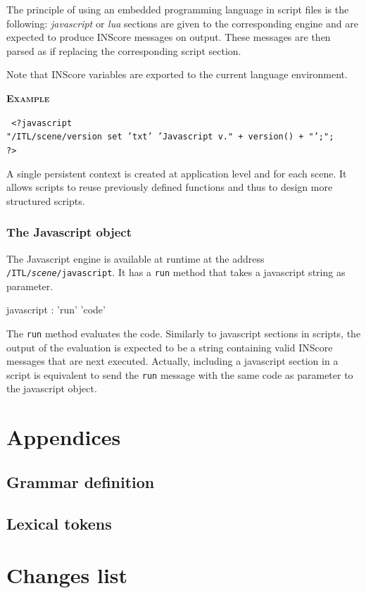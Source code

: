 \documentclass[a4paper,twoside]{report}
\newcommand{\toplevel}[1]	{\chapter{#1}}
\newcommand{\sublevel}[1]	{\section{#1}}
\newcommand{\subsublevel}[1]	{\subsection{#1}}
\newcommand{\OSC}[1]		{\texttt{#1}}
\newcommand{\example}		{\textbf{\hspace{-1.5cm}\textbf{\textsc{Example }}}}
\newcommand{\note}	[1]		{\vspace{2mm}\textbf{\hspace{-1.03cm}\textbf{\textsc{Note #1}}}}
\newcommand{\sample}	[1]			{\vspace{-2mm}\begin{center}\colorbox{mygrey}{
								\begin{minipage}[t]{0.9\columnwidth} 
								{\small \texttt{#1}}
								\end{minipage}}\end{center}}
\begin{document}
The principle of using an embedded programming language in script files is the following: \emph{javascript} or \emph{lua} sections are given to the corresponding engine and are expected to produce INScore messages on output.
These messages are then parsed as if replacing the corresponding script section.

Note that INScore variables are exported to the current language environment.

\example
\sample{
<?javascript \\
\hspace*{3mm} "/ITL/scene/version set 'txt' 'Javascript v."  + version() + "';"; \\
\hspace*{1mm} ?>
}


A single persistent context is created at application level and for each scene.
It allows scripts to reuse previously defined functions and thus to design more structured scripts.


\subsublevel{The Javascript object}\label{jsobj}

The Javascript engine is available at runtime at the address \OSC{/ITL/\textit{scene}/javascript}. It has a \OSC{run} method that takes a javascript string as parameter.

\begin{rail} 
javascript :  'run' 'code'
\end{rail}

The \OSC{run} method evaluates the code. Similarly to javascript sections in scripts, the output of the evaluation is expected to be a string containing valid INScore messages that are next executed. 
Actually, including a javascript section in a script is equivalent to send the \OSC{run} message with the same code as parameter to the javascript object.


%


\toplevel{Appendices}
\sublevel{Grammar definition}
\label{yacc}


\sublevel{Lexical tokens}
\label{lex}



\toplevel{ Changes list}
\label{changes}



\printindex
\end{document}
